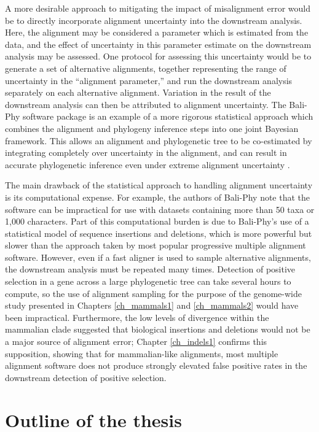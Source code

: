 A more desirable approach to mitigating the impact of misalignment
error would be to directly incorporate alignment uncertainty into the
downstream analysis. Here, the alignment may be considered a parameter
which is estimated from the data, and the effect of uncertainty in
this parameter estimate on the downstream analysis may be
assessed. One protocol for assessing this uncertainty would be to
generate a set of alternative alignments, together representing the
range of uncertainty in the ``alignment parameter,'' and run the
downstream analysis separately on each alternative
alignment. Variation in the result of the downstream analysis can then
be attributed to alignment uncertainty. The Bali-Phy software package
\citep{Suchard2006,Bradley2009} is an example of a more rigorous
statistical approach which combines the alignment and phylogeny
inference steps into one joint Bayesian framework. This allows an
alignment and phylogenetic tree to be co-estimated by integrating
completely over uncertainty in the alignment, and can result in
accurate phylogenetic inference even under extreme alignment
uncertainty \citep{Redelings2007}.

The main drawback of the statistical approach to handling alignment
uncertainty is its computational expense. For example, the authors of
Bali-Phy note that the software can be impractical for use with
datasets containing more than 50 taxa or 1,000 characters. Part of
this computational burden is due to Bali-Phy's use of a statistical
model of sequence insertions and deletions, which is more powerful but
slower than the approach taken by most popular progressive multiple
alignment software. However, even if a fast aligner is used to sample
alternative alignments, the downstream analysis must be repeated many
times. Detection of positive selection in a gene across a large
phylogenetic tree can take several hours to compute, so the use of
alignment sampling for the purpose of the genome-wide study presented
in Chapters \ref{ch_mammals1} and \ref{ch_mammals2} would have been
impractical. Furthermore, the low levels of divergence within the
mammalian clade suggested that biological insertions and deletions
would not be a major source of alignment error; Chapter
\ref{ch_indels1} confirms this supposition, showing that for
mammalian-like alignments, most multiple alignment software does not
produce strongly elevated false positive rates in the downstream
detection of positive selection.


\section{Outline of the thesis}

